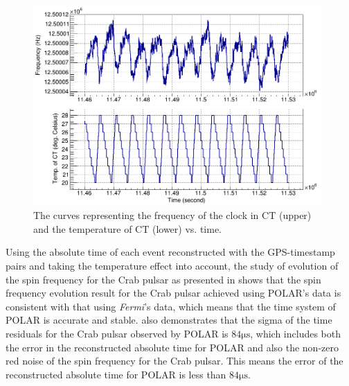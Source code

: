 \documentclass{raa}
\begin{document}
\begin{figure}[!ht]
\centering
\includegraphics[width=11cm]{images/freq_vs_temp.png}
\caption{The curves representing the frequency of the clock in CT (upper) and the temperature of CT (lower) vs. time.}\label{fig:freq_vs_temp}
\end{figure}

Using the absolute time of each event reconstructed with the GPS-timestamp pairs and taking the temperature effect into account, the study of evolution of the spin frequency for the Crab pulsar as presented in \citealt{Zheng2017} shows that the spin frequency evolution result for the Crab pulsar achieved using POLAR's data is consistent with that using \textit{Fermi}'s data, which means that the time system of POLAR is accurate and stable. \citealt{Zheng2017} also demonstrates that the sigma of the time residuals for the Crab pulsar observed by POLAR is $84\mathrm{\mu s}$, which includes both the error in the reconstructed absolute time for POLAR and also the non-zero red noise of the spin frequency for the Crab pulsar. This means the error of the reconstructed absolute time for POLAR is less than $84\mathrm{\mu s}$.
\end{document}
